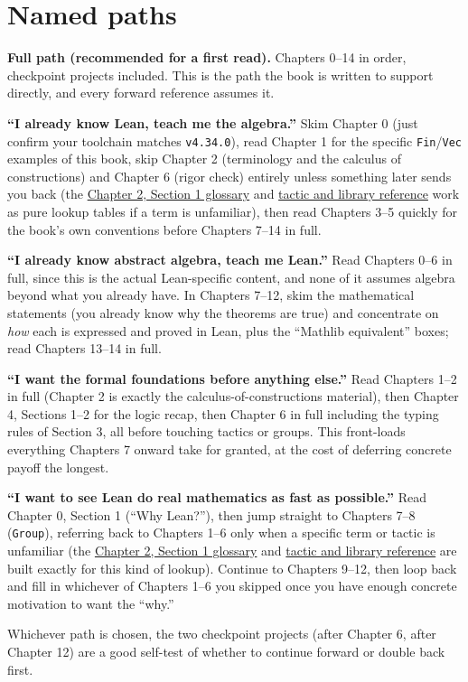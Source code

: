 \section*{Named paths}
\label{sec:root:learning-paths:3}

\textbf{Full path (recommended for a first read).} Chapters 0--14 in order, checkpoint projects included. This is the path the book is written to support directly, and every forward reference assumes it.

\textbf{``I already know Lean, teach me the algebra.''} Skim Chapter 0 (just confirm your toolchain matches \texttt{v4.34.0}), read Chapter 1 for the specific \texttt{Fin}/\texttt{Vec} examples of this book, skip Chapter 2 (terminology and the calculus of constructions) and Chapter 6 (rigor check) entirely unless something later sends you back (the \hyperref[sec:02-terminology-and-coc:01-terminology:1]{Chapter 2, Section 1 glossary} and \hyperref[sec:root:tactic-and-library-reference:1]{tactic and library reference} work as pure lookup tables if a term is unfamiliar), then read Chapters 3--5 quickly for the book's own conventions before Chapters 7--14 in full.

\textbf{``I already know abstract algebra, teach me Lean.''} Read Chapters 0--6 in full, since this is the actual Lean-specific content, and none of it assumes algebra beyond what you already have. In Chapters 7--12, skim the mathematical statements (you already know why the theorems are true) and concentrate on \emph{how} each is expressed and proved in Lean, plus the ``Mathlib equivalent'' boxes; read Chapters 13--14 in full.

\textbf{``I want the formal foundations before anything else.''} Read Chapters 1--2 in full (Chapter 2 is exactly the calculus-of-constructions material), then Chapter 4, Sections 1--2 for the logic recap, then Chapter 6 in full including the typing rules of Section 3, all before touching tactics or groups. This front-loads everything Chapters 7 onward take for granted, at the cost of deferring concrete payoff the longest.

\textbf{``I want to see Lean do real mathematics as fast as possible.''} Read Chapter 0, Section 1 (``Why Lean?''), then jump straight to Chapters 7--8 (\texttt{Group}), referring back to Chapters 1--6 only when a specific term or tactic is unfamiliar (the \hyperref[sec:02-terminology-and-coc:01-terminology:1]{Chapter 2, Section 1 glossary} and \hyperref[sec:root:tactic-and-library-reference:1]{tactic and library reference} are built exactly for this kind of lookup). Continue to Chapters 9--12, then loop back and fill in whichever of Chapters 1--6 you skipped once you have enough concrete motivation to want the ``why.''

Whichever path is chosen, the two checkpoint projects (after Chapter 6, after Chapter 12) are a good self-test of whether to continue forward or double back first.
